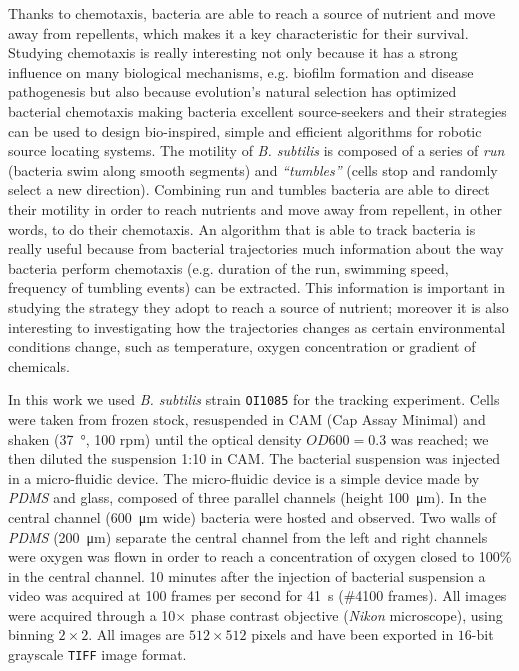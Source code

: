 Thanks to chemotaxis, bacteria are able to reach a source of nutrient and move away from repellents, which makes it a key characteristic for their survival. Studying chemotaxis is really interesting not only because it has a strong influence on many biological mechanisms, e.g. biofilm formation and disease pathogenesis but also because  evolution's natural selection has optimized bacterial chemotaxis making bacteria excellent source-seekers and their strategies can be used to design bio-inspired, simple and efficient algorithms for robotic source locating systems. 
The motility  of \textit{B. subtilis} is composed of a series of \textit{run} (bacteria swim along smooth segments) and \textit{``tumbles''} (cells stop and randomly select a new direction).
Combining run and tumbles bacteria are able to direct their motility in order to reach nutrients and move away from repellent, in other words, to do their chemotaxis.
An algorithm that is able to track bacteria is really useful  because from bacterial trajectories much information about the way bacteria perform chemotaxis (e.g. duration of the run, swimming speed, frequency of tumbling events) can be extracted. 
This information is important in studying the strategy they adopt to reach a source of nutrient; moreover it is also interesting to investigating how the trajectories changes as certain environmental conditions change, such as temperature, oxygen concentration or gradient of chemicals.


In this work we used \textit{B. subtilis} strain \texttt{OI1085} for the tracking experiment.
Cells were taken from frozen stock, resuspended in CAM (Cap Assay Minimal) and shaken  (\SI{37}{\degree}, 100 rpm) until the optical density $OD600=0.3$ was reached; we then diluted the suspension 1:10 in CAM.
The bacterial suspension was injected in a micro-fluidic device.
The micro-fluidic device is a simple device made by \textit{PDMS} and glass, composed of three parallel channels (height  \SI{100}{\micro\meter}).
In the central channel (\SI{600}{\micro\meter} wide) bacteria were hosted and observed.
Two  walls of \textit{PDMS} (\SI{200}{\micro\metre}) separate the central channel from the left and right channels were oxygen was flown in order to reach a concentration of oxygen closed to 100\% in the central channel.
10 minutes after the injection of bacterial suspension a video was acquired at 100 frames per second for \SI{41}{\second}  (\#4100 frames). All images were acquired through a 10$\times$ phase contrast objective (\textit{Nikon} microscope), using binning $2 \times 2$.
All images are $512 \times 512$ pixels and have been exported in $16$-bit grayscale \texttt{TIFF} image format.

